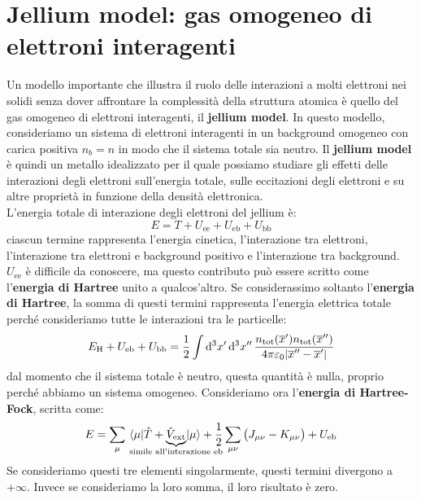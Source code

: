 \chapter{Jellium model: gas omogeneo di elettroni interagenti}
Un modello importante che illustra il ruolo delle interazioni a molti elettroni nei solidi senza dover affrontare la complessità della struttura atomica è quello del gas omogeneo di elettroni interagenti, il \textbf{jellium model}. In questo modello, consideriamo un sistema di elettroni interagenti in un background omogeneo con carica positiva $n_b=n$ in modo che il sistema totale sia neutro. Il \textbf{jellium model} è quindi un metallo idealizzato per il quale possiamo studiare gli effetti delle interazioni degli elettroni sull'energia totale, sulle eccitazioni degli elettroni e su altre proprietà in funzione della densità elettronica.\\
L'energia totale di interazione degli elettroni del jellium è:
\begin{equation*}
    E=T+U_{\text{ee}}+U_{\text{eb}}+U_{\text{bb}}
\end{equation*}
ciascun termine rappresenta l'energia cinetica, l'interazione tra elettroni, l'interazione tra elettroni e background positivo e l'interazione tra background.
$U_{\text{ee}}$ è difficile da conoscere, ma questo contributo può essere scritto come l'\textbf{energia di Hartree} unito a qualcos'altro. Se considerassimo soltanto l'\textbf{energia di Hartree}, la somma di questi termini rappresenta l'energia elettrica totale perché consideriamo tutte le interazioni tra le particelle:
\begin{equation*}
    E_{\text H}+U_{\text{eb}}+U_{\text{bb}}=\frac 12 \int \dd[3]{x'}\dd[3]{x''}\frac{n_{\text{tot}}(\overline{x}')n_{\text{tot}}(\overline{x}'')}{4\pi\varepsilon_0|\overline{x}''-\overline{x}'|}
\end{equation*}
dal momento che il sistema totale è neutro, questa quantità è nulla, proprio perché abbiamo un sistema omogeneo. Consideriamo ora l'\textbf{energia di Hartree-Fock}, scritta come:
\begin{equation*}
    E=\sum_{\mu}\mel{\mu}{\hat T + \underbrace{\hat{V}_{\text{ext}}}_{\mathclap{\text{simile all'interazione eb}}}}{\mu}+\frac 12 \sum_{\mu\nu}\big(J_{\mu\nu}-K_{\mu\nu}\big)+U_{\text{eb}}
\end{equation*}
Se consideriamo questi tre elementi singolarmente, questi termini divergono a $+\infty$. Invece se consideriamo la loro somma, il loro risultato è zero. \\
